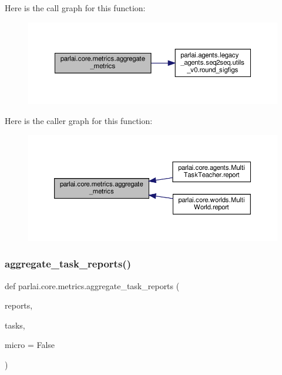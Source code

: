 Here is the call graph for this function\+:
\nopagebreak
\begin{figure}[H]
\begin{center}
\leavevmode
\includegraphics[width=350pt]{namespaceparlai_1_1core_1_1metrics_aa4ed5491962e06684b235fffe1b20fec_cgraph}
\end{center}
\end{figure}
Here is the caller graph for this function\+:
\nopagebreak
\begin{figure}[H]
\begin{center}
\leavevmode
\includegraphics[width=350pt]{namespaceparlai_1_1core_1_1metrics_aa4ed5491962e06684b235fffe1b20fec_icgraph}
\end{center}
\end{figure}
\mbox{\label{namespaceparlai_1_1core_1_1metrics_ae323045c05ed03d93c260521ebb8bf71}} 
\subsubsection{\texorpdfstring{aggregate\+\_\+task\+\_\+reports()}{aggregate\_task\_reports()}}
{\footnotesize\ttfamily def parlai.\+core.\+metrics.\+aggregate\+\_\+task\+\_\+reports (\begin{DoxyParamCaption}\item[{}]{reports,  }\item[{}]{tasks,  }\item[{}]{micro = {\ttfamily False} }\end{DoxyParamCaption})}

